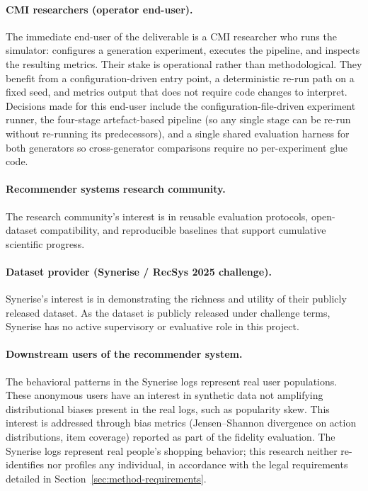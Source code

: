 \documentclass[sigconf,nonacm]{acmart}
\begin{document}
\paragraph{CMI researchers (operator end-user).}
The immediate end-user of the deliverable is a CMI researcher who runs the
simulator: configures a generation experiment, executes the pipeline, and
inspects the resulting metrics. Their stake is operational rather than
methodological. They benefit from a configuration-driven entry point, a
deterministic re-run path on a fixed seed, and metrics output that does not
require code changes to interpret. Decisions made for this end-user
include the configuration-file-driven experiment runner, the four-stage
artefact-based pipeline (so any single stage can be re-run without
re-running its predecessors), and a single shared evaluation harness for
both generators so cross-generator comparisons require no per-experiment
glue code.

\paragraph{Recommender systems research community.}
The research community's interest is in reusable evaluation protocols,
open-dataset compatibility, and reproducible baselines that support
cumulative scientific progress.

\paragraph{Dataset provider (Synerise / RecSys 2025 challenge).}
Synerise's interest is in demonstrating the richness and utility of their
publicly released dataset. As the dataset is publicly released under
challenge terms, Synerise has no active supervisory or evaluative role in
this project.

\paragraph{Downstream users of the recommender system.}
The behavioral patterns in the Synerise logs represent real user
populations. These anonymous users have an interest in synthetic data not
amplifying distributional biases present in the real logs, such as
popularity skew. This interest is addressed through bias metrics
(Jensen--Shannon divergence on action distributions, item coverage) reported
as part of the fidelity evaluation. The Synerise logs represent real
people's shopping behavior; this research neither re-identifies nor profiles
any individual, in accordance with the legal requirements detailed in
Section~\ref{sec:method-requirements}.
\end{document}
